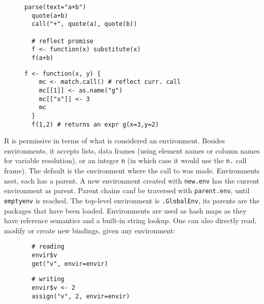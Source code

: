 \documentclass[screen,acmsmall]{acmart}%
\renewcommand{\k}[1]{\lstinline |#1|\xspace}
\begin{document}
\begin{figure}[htb]
\begin{minipage}{.49\textwidth}
\begin{lstlisting}[caption={Examples of calls producing expression \k{a+b}},label=lst:exprs]
  parse(text="a+b")
  quote(a+b)
  call("+", quote(a), quote(b))

  # reflect promise
  f <- function(x) substitute(x)
  f(a+b)
  \end{lstlisting}
\end{minipage}
\begin{minipage}{.49\textwidth}
  \begin{lstlisting}[caption={Example of a call reflection},label=lst:match.call]
  f <- function(x, y) {
    mc <- match.call() # reflect curr. call
    mc[[1]] <- as.name("g")
    mc[["x"]] <- 3
    mc
  }
  f(1,2) # returns an expr g(x=3,y=2)
  \end{lstlisting}
\end{minipage}
\end{figure}

R is permissive in terms of what is considered an environment. Besides
environments, it accepts lists, data frames (using element names or column names
for variable resolution), or an integer \k{n} (in which case it would use the
\k{n.} call frame). The default is the environment where the call to \eval was
made.
%
Environments nest, each has a parent. A new environment created with \k{new.env}
has the current environment as parent. Parent chains canf be traversed with
\k{parent.env}, until \k{emptyenv} is reached. The top-level environment is
\k{.GlobalEnv}, its parents are the packages that have been loaded. Environments
are used as hash maps as they have reference semantics and a built-in string
lookup. One can also directly read, modify or create new bindings, given any
environment:
%
\begin{figure}[H]
\begin{minipage}{.49\textwidth}
  \begin{lstlisting}
  # reading
  envir$v
  get("v", envir=envir)
  \end{lstlisting}
\end{minipage}
\begin{minipage}{.49\textwidth}
  \begin{lstlisting}
  # writing
  envir$v <- 2
  assign("v", 2, envir=envir)
  \end{lstlisting}
\end{minipage}
\end{figure}
%
\end{document}
